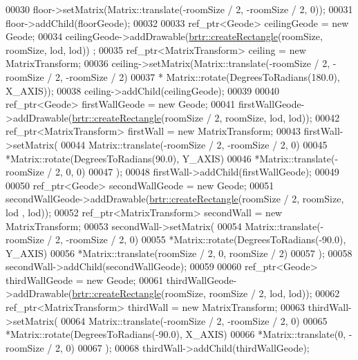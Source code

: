 \begin{DoxyCode}
00030         floor->setMatrix(Matrix::translate(-roomSize / 2, -roomSize / 2, 0));
00031         floor->addChild(floorGeode);
00032 
00033         ref\_ptr<Geode> ceilingGeode = \textcolor{keyword}{new} Geode;
00034         ceilingGeode->addDrawable(\hyperlink{namespacebrtr_a793c6ef7f57632fc5ac280b94f60dd65}{brtr::createRectangle}(roomSize, roomSize, lod, lod))
      ;
00035         ref\_ptr<MatrixTransform> ceiling = \textcolor{keyword}{new} MatrixTransform;
00036         ceiling->setMatrix(Matrix::translate(-roomSize / 2, -roomSize / 2, -roomSize / 2)
00037             * Matrix::rotate(DegreesToRadians(180.0), X\_AXIS));
00038         ceiling->addChild(ceilingGeode);
00039 
00040         ref\_ptr<Geode> firstWallGeode = \textcolor{keyword}{new} Geode;
00041         firstWallGeode->addDrawable(\hyperlink{namespacebrtr_a793c6ef7f57632fc5ac280b94f60dd65}{brtr::createRectangle}(roomSize / 2, roomSize, lod,
       lod));
00042         ref\_ptr<MatrixTransform> firstWall = \textcolor{keyword}{new} MatrixTransform;
00043         firstWall->setMatrix(
00044             Matrix::translate(-roomSize / 2, -roomSize / 2, 0)
00045             *Matrix::rotate(DegreesToRadians(90.0), Y\_AXIS)
00046             *Matrix::translate(-roomSize / 2, 0, 0)
00047             );
00048         firstWall->addChild(firstWallGeode);
00049 
00050         ref\_ptr<Geode> secondWallGeode = \textcolor{keyword}{new} Geode;
00051         secondWallGeode->addDrawable(\hyperlink{namespacebrtr_a793c6ef7f57632fc5ac280b94f60dd65}{brtr::createRectangle}(roomSize / 2, roomSize, lod
      , lod));
00052         ref\_ptr<MatrixTransform> secondWall = \textcolor{keyword}{new} MatrixTransform;
00053         secondWall->setMatrix(
00054             Matrix::translate(-roomSize / 2, -roomSize / 2, 0)
00055             *Matrix::rotate(DegreesToRadians(-90.0), Y\_AXIS)
00056             *Matrix::translate(roomSize / 2, 0, roomSize / 2)
00057             );
00058         secondWall->addChild(secondWallGeode);
00059 
00060         ref\_ptr<Geode> thirdWallGeode = \textcolor{keyword}{new} Geode;
00061         thirdWallGeode->addDrawable(\hyperlink{namespacebrtr_a793c6ef7f57632fc5ac280b94f60dd65}{brtr::createRectangle}(roomSize, roomSize / 2, lod,
       lod));
00062         ref\_ptr<MatrixTransform> thirdWall = \textcolor{keyword}{new} MatrixTransform;
00063         thirdWall->setMatrix(
00064             Matrix::translate(-roomSize / 2, -roomSize / 2, 0)
00065             *Matrix::rotate(DegreesToRadians(-90.0), X\_AXIS)
00066             *Matrix::translate(0, -roomSize / 2, 0)
00067             );
00068         thirdWall->addChild(thirdWallGeode);

\end{DoxyCode}
